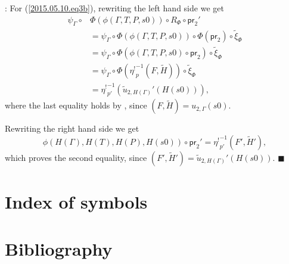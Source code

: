 \documentclass[12pt]{article}
\numberwithin{equation}{section}
\newenvironment{myproof}{{\bf Proof}:}{$\blacksquare$ \vskip 5mm }
\newcommand{\wt}{\widetilde}
\newcommand{\etashriek}{\eta^!}
\newcommand{\etaunshriek}{{\etashriek}^{-1}}
\newcommand{\pr}{\mathsf{pr}}
\begin{document}
\begin{myproof}
For (\ref{2015.05.10.eq3b}), rewriting the left hand side we get
%
\begin{align*}
  \psi_{\Gamma}\circ & \Phi(\phi(\Gamma,T,P,s0))\circ R_{\Phi}\circ \pr_2'  \\
    & = \psi_{\Gamma}\circ \Phi(\phi(\Gamma,T,P,s0))\circ \Phi(\pr_2)\circ \wt{\xi}_{\Phi} \\
    & = \psi_{\Gamma}\circ \Phi(\phi(\Gamma,T,P,s0)\circ \pr_2)\circ \wt{\xi}_{\Phi} \\
    & = \psi_{\Gamma}\circ \Phi(\etaunshriek_p(F,\wt{H}))\circ \wt{\xi}_{\Phi} \\
    & = \etaunshriek_{p'}(\wt{u}_{2,H(\Gamma)}'(H(s0))),
\end{align*}
%
where the last equality holds by \cite[Lemma 6.2(2)]{fromunivwithPi}, since
$(F,\wt{H})=u_{2,\Gamma}(s0)$.

Rewriting the right hand side we get
%
$$\phi(H(\Gamma),H(T),H(P),H(s0))\circ \pr_2'=\etaunshriek_{p'}(F',\wt{H}'),$$
%
which proves the second equality, since
$(F',\wt{H}')=\wt{u}_{2,H(\Gamma)}'(H(s0))$.
\end{myproof}

\section{Index of symbols}
\printglossaries

\section{Bibliography}


\end{document}
